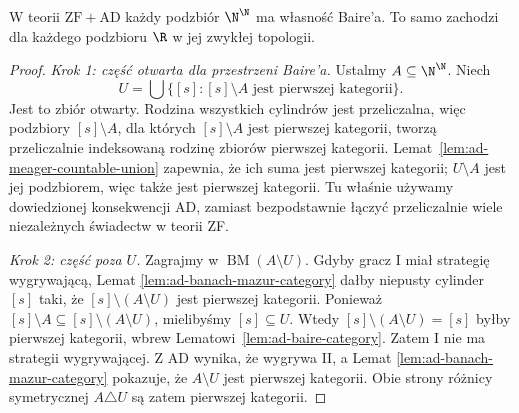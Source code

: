 \begin{twierdzenie}
\label{thm:ad-baire-property}
W teorii $\mathrm{ZF}+\mathrm{AD}$ każdy podzbiór
$\N^\N$ ma własność Baire'a. To samo zachodzi dla
każdego podzbioru $\R$ w jej zwykłej topologii.
\end{twierdzenie}
\begin{proof}
\emph{Krok 1: część otwarta dla przestrzeni Baire'a.}
Ustalmy $A\subseteq\N^\N$. Niech
\[
U=\bigcup\{[s]:[s]\setminus A\text{ jest pierwszej kategorii}\}.
\]
Jest to zbiór otwarty.
Rodzina wszystkich cylindrów jest przeliczalna,
więc podzbiory $[s]\setminus A$,
dla których $[s]\setminus A$ jest pierwszej kategorii,
tworzą przeliczalnie indeksowaną rodzinę
zbiorów pierwszej kategorii.
Lemat~\ref{lem:ad-meager-countable-union}
zapewnia, że ich suma jest pierwszej kategorii;
$U\setminus A$ jest jej podzbiorem,
więc także jest pierwszej kategorii.
Tu właśnie używamy dowiedzionej konsekwencji AD,
zamiast bezpodstawnie łączyć przeliczalnie wiele
niezależnych świadectw w teorii ZF.

\emph{Krok 2: część poza $U$.}
Zagrajmy w $\operatorname{BM}(A\setminus U)$.
Gdyby gracz I miał strategię wygrywającą, Lemat
\ref{lem:ad-banach-mazur-category} dałby niepusty
cylinder $[s]$ taki, że $[s]\setminus(A\setminus U)$
jest pierwszej kategorii. Ponieważ
$[s]\setminus A\subseteq[s]\setminus(A\setminus U)$,
mielibyśmy $[s]\subseteq U$. Wtedy
$[s]\setminus(A\setminus U)=[s]$ byłby pierwszej
kategorii, wbrew Lematowi~\ref{lem:ad-baire-category}.
Zatem I nie ma strategii wygrywającej. Z $\mathrm{AD}$
wynika, że wygrywa II, a Lemat
\ref{lem:ad-banach-mazur-category} pokazuje, że
$A\setminus U$ jest pierwszej kategorii.
Obie strony różnicy symetrycznej $A\triangle U$ są zatem
pierwszej kategorii.


\end{proof}
